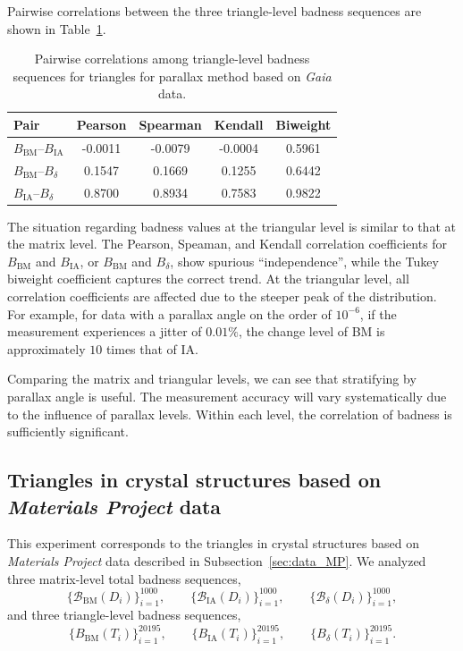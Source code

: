 \documentclass[11pt]{article}
\begin{document}
Pairwise correlations between the three triangle-level badness sequences are shown in Table~\ref{tab:Gaia_triangle_corr}.
\begin{table}[h!]
\centering
\caption{Pairwise correlations among triangle-level badness sequences for triangles for parallax method based on \textit{Gaia} data.}
\label{tab:Gaia_triangle_corr}
\small
\setlength{\tabcolsep}{7pt}
\begin{tabular}{lcccc}
\hline
Pair & Pearson & Spearman & Kendall & Biweight \\
\hline
\({B}_{\mathrm{BM}}\)--\({B}_{\mathrm{IA}}\) & -0.0011 & -0.0079 & -0.0004 & 0.5961 \\
\({B}_{\mathrm{BM}}\)--\({B}_{\delta}\) & 0.1547 & 0.1669 & 0.1255 & 0.6442 \\
\({B}_{\mathrm{IA}}\)--\({B}_{\delta}\) & 0.8700 & 0.8934 & 0.7583 & 0.9822 \\
\hline
\end{tabular}
\end{table}

The situation regarding badness values at the triangular level is similar to that at the matrix level. The Pearson, Speaman, and Kendall correlation coefficients for \({B}_{\mathrm{BM}}\) and \({B}_{\mathrm{IA}}\), or \({B}_{\mathrm{BM}}\) and \({B}_{\delta}\), show spurious ``independence'', while the Tukey biweight coefficient captures the correct trend. At the triangular level, all correlation coefficients are affected due to the steeper peak of the distribution. For example, for data with a parallax angle on the order of \(10^{-6}\), if the measurement experiences a jitter of \(0.01\%\), the change level of BM is approximately \(10\) times that of IA.

Comparing the matrix and triangular levels, we can see that stratifying by parallax angle is useful. The measurement accuracy will vary systematically due to the influence of parallax levels. Within each level, the correlation of badness is sufficiently significant.

\subsection{Triangles in crystal structures based on \textit{Materials Project} data}
\label{sec:MP_correlation}

This experiment corresponds to the triangles in crystal structures based on \textit{Materials Project} data described in Subsection~\ref{sec:data_MP}. We analyzed three matrix-level total badness sequences,
\[
\{\mathcal{B}_{\mathrm{BM}}(D_i)\}_{i=1}^{1000},\qquad
\{\mathcal{B}_{\mathrm{IA}}(D_i)\}_{i=1}^{1000},\qquad
\{\mathcal{B}_{\delta}(D_i)\}_{i=1}^{1000},
\]
and three triangle-level badness sequences, 
\[
\{{B}_{\mathrm{BM}}(T_i)\}_{i=1}^{20195},\qquad
\{{B}_{\mathrm{IA}}(T_i)\}_{i=1}^{20195},\qquad
\{{B}_{\delta}(T_i)\}_{i=1}^{20195}.
\]
\end{document}
